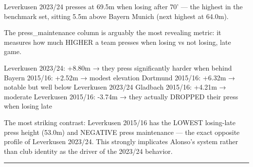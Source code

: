 \documentclass[
]{article}
\begin{document}
Leverkusen 2023/24 presses at 69.5m when losing after 70' --- the
highest in the benchmark set, sitting 5.5m above Bayern Munich (next
highest at 64.0m).

The press\_maintenance column is arguably the most revealing metric: it
measures how much HIGHER a team presses when losing vs not losing, late
game.

Leverkusen 2023/24: +8.80m → they press significantly harder when behind
Bayern 2015/16: +2.52m → modest elevation Dortmund 2015/16: +6.32m →
notable but well below Leverkusen 2023/24 Gladbach 2015/16: +4.21m →
moderate Leverkusen 2015/16: -3.74m → they actually DROPPED their press
when losing late

The most striking contrast: Leverkusen 2015/16 has the LOWEST
losing-late press height (53.0m) and NEGATIVE press maintenance --- the
exact opposite profile of Leverkusen 2023/24. This strongly implicates
Alonso's system rather than club identity as the driver of the 2023/24
behavior.

\begin{center}\rule{0.5\linewidth}{0.5pt}\end{center}
\end{document}

